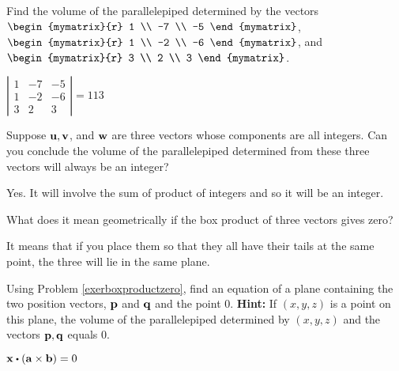 \begin{enumialphparenastyle}

\begin{ex} Find the volume of the parallelepiped determined by the vectors
$\begin{mymatrix}{r}
1 \\
-7 \\
-5
\end{mymatrix} $, \\
 $\begin{mymatrix}{r}
1 \\
-2 \\
-6
\end{mymatrix}$, and $\begin{mymatrix}{r}
3 \\
2 \\
3
\end{mymatrix}$.
\begin{sol}
 $\left\vert
\begin{array}{rrr}
1 & -7 & -5 \\
1 & -2 & -6 \\
3 & 2 & 3
\end{array}
\right\vert = 113$
\end{sol}
\end{ex}

\begin{ex} Suppose ${\bf u},{\bf v}$, and ${\bf w}$ are three vectors whose
components are all integers. Can you conclude the volume of the
parallelepiped determined from these three vectors will always be an integer?
\begin{sol}
Yes. It will involve the sum of product of integers and so it will
be an integer.
\end{sol}
\end{ex}

\begin{ex} \label{exerboxproductzero} What does it mean geometrically if the box
product of three vectors gives zero?
\begin{sol}
It means that if you place them so that
they all have their tails at the same point, the three will lie in the same
plane.
\end{sol}
\end{ex}

\begin{ex} Using Problem \ref{exerboxproductzero}, find an equation of a plane
containing the two position vectors, ${\bf p}$ and ${\bf q}$ and the
point $0$. 
\textbf{Hint: }If $\left( x,y,z\right) $ is a point on
this plane, the volume of the parallelepiped determined by $\left(
x,y,z\right) $ and the vectors ${\bf p},{\bf q}$ equals 0.
\begin{sol}
$\vect{x}\dotprod \left( \vect{a}\times \vect{b}\right) =0$
\end{sol}
\end{ex}


\end{enumialphparenastyle}
